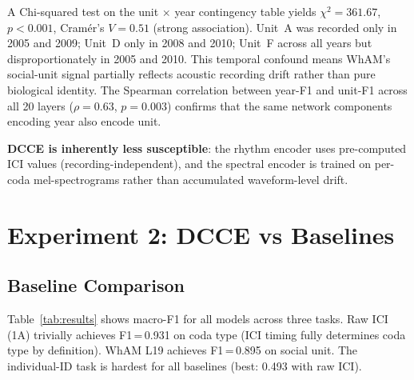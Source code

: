 \documentclass[9pt,a4paper,twocolumn,twoside]{rho-class/rho}
\begin{document}
A Chi-squared test on the unit $\times$ year contingency table yields $\chi^2=361.67$, $p<0.001$, Cram\'{e}r's $V = 0.51$ (strong association). Unit~A was recorded only in 2005 and 2009; Unit~D only in 2008 and 2010; Unit~F across all years but disproportionately in 2005 and 2010. This temporal confound means WhAM's social-unit signal partially reflects acoustic recording drift rather than pure biological identity. The Spearman correlation between year-F1 and unit-F1 across all 20 layers ($\rho=0.63$, $p=0.003$) confirms that the same network components encoding year also encode unit.

\textbf{DCCE is inherently less susceptible}: the rhythm encoder uses pre-computed ICI values (recording-independent), and the spectral encoder is trained on per-coda mel-spectrograms rather than accumulated waveform-level drift.

\section{Experiment 2: DCCE vs Baselines}
\label{sec:dcce}

\subsection{Baseline Comparison}

Table~\ref{tab:results} shows macro-F1 for all models across three tasks. Raw ICI (1A) trivially achieves F1\,=\,0.931 on coda type (ICI timing fully determines coda type by definition). WhAM L19 achieves F1\,=\,0.895 on social unit. The individual-ID task is hardest for all baselines (best: 0.493 with raw ICI).
\end{document}
